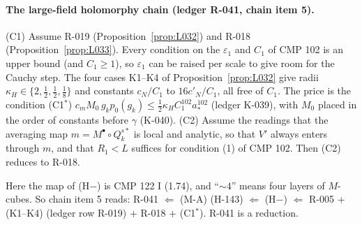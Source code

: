 \paragraph{The large-field holomorphy chain (ledger R-041, chain item 5).}
\begin{proposition}\label{src:T2-HMINUSC}
(C1) Assume R-019 (Proposition~\ref{prop:L032}) and R-018 (Proposition~\ref{prop:L033}). Every condition on the $\varepsilon_1$ and $C_1$ of CMP 102 is an upper bound (and $C_1\ge1$), so $\varepsilon_1$ can be raised per scale to give room for the Cauchy step. The four cases K1--K4 of Proposition~\ref{prop:L032} give radii $\kappa_H\in\{2,\tfrac12,\tfrac12,\tfrac18\}$ and constants $c_N/C_1$ to $16c'_N/C_1$, all free of $C_1$. The price is the condition (C1$^*$) $c_mM_0\,g_kp_0(g_k)\le\tfrac12\kappa_HC_1^{102}a_*^{102}$ (ledger K-039), with $M_0$ placed in the order of constants before $\gamma$ (K-040).
(C2) Assume the readings that the averaging map $m=M^\bullet\circ Q_k^{s*}$ is local and analytic, so that $V'$ always enters through $m$, and that $R_1<L$ suffices for condition (1) of CMP 102. Then (C2) reduces to R-018.
\end{proposition}
Here the map of (H$-$) is CMP 122 I (1.74), and ``$\sim4$'' means four layers of $M$-cubes. So chain item 5 reads: R-041 $\Leftarrow$ (M-A) (H-143) $\Leftarrow$ (H$-$) $\Leftarrow$ R-005 + (K1--K4) (ledger row R-019) + R-018 + (C1$^*$). R-041 is a reduction.

